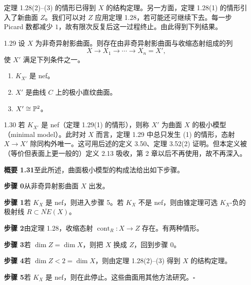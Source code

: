 定理 1.28(2)--(3) 的情形已得到 $X$ 的结构定理。另一方面，定理 1.28(1) 的情形引入了新曲面 $Z$。我们可以对 $Z$ 应用定理 1.28，若可能还可继续下去。每一步 Picard 数都减少 $1$，故有限次反复后这一过程终止。由此得到下列结果。

\begin{theorem*}{1.29}
设 $X$ 为非奇异射影曲面。则存在由非奇异射影曲面与收缩态射组成的列
\[ X\to X_1\to\cdots\to X_n=X', \]
使 $X'$ 满足下列条件之一。

\begin{enumerate}
\item $K_{X'}$ 是 nef。
\item $X'$ 是曲线 $C$ 上的极小直纹曲面。
\item $X'\cong\mathbb{P}^2$。
\end{enumerate}
\end{theorem*}

\begin{definition}{1.30}
若 $K_{X'}$ 是 nef（定理 1.29(1) 的情形），则称 $X'$ 为曲面 $X$ 的极小模型（minimal model）。此时对 $X$ 而言，定理 1.29 中总只发生 (1) 的情形，态射 $X\to X'$ 除同构外唯一。这可用后述的定义 3.50、定理 3.52(2) 证明。但本定义被（等价但表面上更一般的）定义 2.13 吸收，第 2 章以后不再使用，故不再深入。
\end{definition}

\par\medskip\noindent\textbf{概要 1.31}\quad 至此所述，曲面极小模型的构成法给出如下步骤。

\par\smallskip\noindent\textbf{步骤 0}\quad 从非奇异射影曲面 $X$ 出发。

\par\smallskip\noindent\textbf{步骤 1}\quad 若 $K_X$ 是 nef，则进入步骤 5。若 $K_X$ 不是 nef，则由锥定理可选 $K_X$-负的极射线 $R\subset\overline{NE}(X)$。

\par\smallskip\noindent\textbf{步骤 2}\quad 由定理 1.28，收缩态射 $\operatorname{cont}_R:X\to Z$ 存在。有两种情形。

\par\smallskip\noindent\textbf{步骤 3}\quad 若 $\dim Z=\dim X$，则把 $X$ 换成 $Z$，回到步骤 0。

\par\smallskip\noindent\textbf{步骤 4}\quad 若 $\dim Z<2=\dim X$，则由定理 1.28(2)--(3) 得到 $X$ 的结构定理。

\par\smallskip\noindent\textbf{步骤 5}\quad 若 $K_X$ 是 nef，则在此停止。这些曲面用其他方法研究。\hfill$\square$

